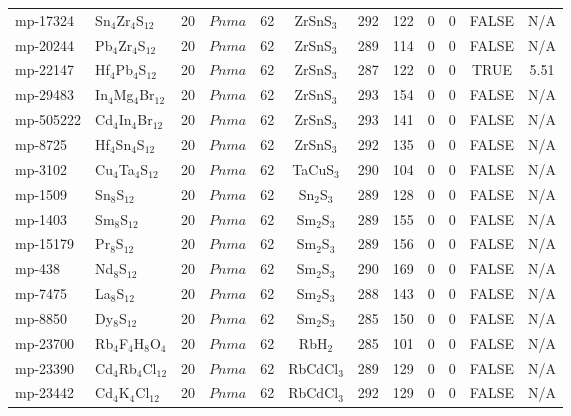 {\begin{longtable}{llcccccccccc}
    mp-17324 & Sn$_{4}$Zr$_{4}$S$_{12}$ & 20    & $Pnma$ & 62    & ZrSnS$_{3}$ & 292   & 122   & 0     & 0     & FALSE & N/A \\
    mp-20244 & Pb$_{4}$Zr$_{4}$S$_{12}$ & 20    & $Pnma$ & 62    & ZrSnS$_{3}$ & 289   & 114   & 0     & 0     & FALSE & N/A \\
    mp-22147 & Hf$_{4}$Pb$_{4}$S$_{12}$ & 20    & $Pnma$ & 62    & ZrSnS$_{3}$ & 287   & 122   & 0     & 0     & TRUE  & 5.51  \\
    mp-29483 & In$_{4}$Mg$_{4}$Br$_{12}$ & 20    & $Pnma$ & 62    & ZrSnS$_{3}$ & 293   & 154   & 0     & 0     & FALSE & N/A \\
    mp-505222 & Cd$_{4}$In$_{4}$Br$_{12}$ & 20    & $Pnma$ & 62    & ZrSnS$_{3}$ & 293   & 141   & 0     & 0     & FALSE & N/A \\
    mp-8725 & Hf$_{4}$Sn$_{4}$S$_{12}$ & 20    & $Pnma$ & 62    & ZrSnS$_{3}$ & 292   & 135   & 0     & 0     & FALSE & N/A \\
    mp-3102 & Cu$_{4}$Ta$_{4}$S$_{12}$ & 20    & $Pnma$ & 62    & TaCuS$_{3}$ & 290   & 104   & 0     & 0     & FALSE & N/A \\
    mp-1509 & Sn$_{8}$S$_{12}$ & 20    & $Pnma$ & 62    & Sn$_{2}$S$_{3}$ & 289   & 128   & 0     & 0     & FALSE & N/A \\
    mp-1403 & Sm$_{8}$S$_{12}$ & 20    & $Pnma$ & 62    & Sm$_{2}$S$_{3}$ & 289   & 155   & 0     & 0     & FALSE & N/A \\
    mp-15179 & Pr$_{8}$S$_{12}$ & 20    & $Pnma$ & 62    & Sm$_{2}$S$_{3}$ & 289   & 156   & 0     & 0     & FALSE & N/A \\
    mp-438 & Nd$_{8}$S$_{12}$ & 20    & $Pnma$ & 62    & Sm$_{2}$S$_{3}$ & 290   & 169   & 0     & 0     & FALSE & N/A \\
    mp-7475 & La$_{8}$S$_{12}$ & 20    & $Pnma$ & 62    & Sm$_{2}$S$_{3}$ & 288   & 143   & 0     & 0     & FALSE & N/A \\
    mp-8850 & Dy$_{8}$S$_{12}$ & 20    & $Pnma$ & 62    & Sm$_{2}$S$_{3}$ & 285   & 150   & 0     & 0     & FALSE & N/A \\
    mp-23700 & Rb$_{4}$F$_{4}$H$_{8}$O$_{4}$ & 20    & $Pnma$ & 62    & RbH$_{2}$ & 285   & 101   & 0     & 0     & FALSE & N/A \\
    mp-23390 & Cd$_{4}$Rb$_{4}$Cl$_{12}$ & 20    & $Pnma$ & 62    & RbCdCl$_{3}$ & 289   & 129   & 0     & 0     & FALSE & N/A \\
    mp-23442 & Cd$_{4}$K$_{4}$Cl$_{12}$ & 20    & $Pnma$ & 62    & RbCdCl$_{3}$ & 292   & 129   & 0     & 0     & FALSE & N/A \\

\end{longtable}}
